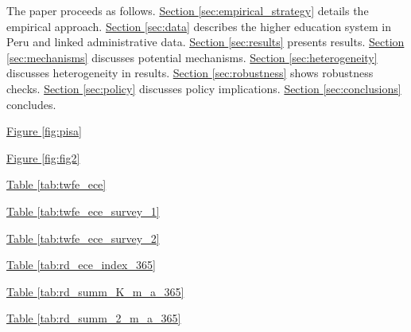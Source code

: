 










The paper proceeds as follows. \hyperref[sec:empirical_strategy]{Section \ref{sec:empirical_strategy}} details the empirical approach. \hyperref[sec:data]{Section \ref{sec:data}}  describes the higher education system in Peru and linked administrative data. \hyperref[sec:results]{Section \ref{sec:results}} presents results. \hyperref[sec:mechanisms]{Section \ref{sec:mechanisms}} discusses potential mechanisms. \hyperref[sec:heterogeneity]{Section \ref{sec:heterogeneity}} discusses heterogeneity in results. \hyperref[sec:robustness]{Section \ref{sec:robustness}} shows robustness checks. \hyperref[sec:policy]{Section \ref{sec:policy}} discusses policy implications. \hyperref[sec:conclusions]{Section \ref{sec:conclusions}} concludes.

\hyperref[fig:pisa]{Figure \ref{fig:pisa}}

\hyperref[fig:fig2]{Figure \ref{fig:fig2}}


\hyperref[tab:twfe_ece]{Table \ref{tab:twfe_ece}}

\hyperref[tab:twfe_ece_survey_1]{Table \ref{tab:twfe_ece_survey_1}}

\hyperref[tab:twfe_ece_survey_2]{Table \ref{tab:twfe_ece_survey_2}}

\hyperref[tab:rd_ece_index_365]{Table \ref{tab:rd_ece_index_365}}

\hyperref[tab:rd_summ_K_m_a_365]{Table \ref{tab:rd_summ_K_m_a_365}}

\hyperref[tab:rd_summ_2_m_a_365]{Table \ref{tab:rd_summ_2_m_a_365}}


